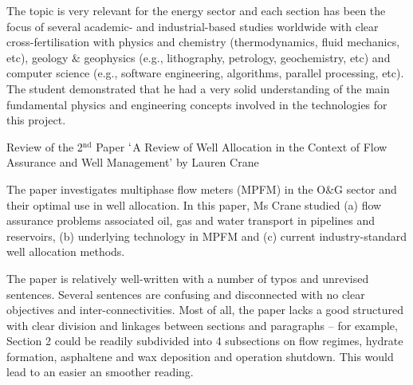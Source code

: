\documentclass[14pt,twoside]{report}
\begin{document}
The topic is very relevant for the energy sector and each section has been the focus of several academic- and industrial-based studies worldwide with clear cross-fertilisation with physics and chemistry (thermodynamics, fluid mechanics, etc), geology $\&$ geophysics (e.g., lithography, petrology, geochemistry, etc) and computer science (e.g., software engineering, algorithms, parallel processing, etc).  The student demonstrated that he had a very solid understanding of the main fundamental physics and engineering concepts involved in the technologies for this project.

\clearpage



\bigskip

\begin{center}
  {\Large Review of the 2$^{\text{nd}}$ Paper $\lq$A Review of Well Allocation in the Context of Flow Assurance and Well Management' by Lauren Crane}
\end{center}

The paper investigates multiphase flow meters (MPFM) in the O$\&$G sector and their optimal use in well allocation. In this paper, Ms Crane studied (a) flow assurance problems associated  oil, gas and water transport in pipelines and reservoirs, (b) underlying technology in MPFM and (c) current industry-standard well allocation methods.

The paper is relatively well-written with a number of typos and unrevised sentences. Several sentences are confusing and disconnected with no clear objectives and inter-connectivities. Most of all, the paper lacks a good structured with clear division and linkages between sections and paragraphs -- for example, Section 2 could be readily subdivided into 4 subsections on flow regimes, hydrate formation, asphaltene and wax deposition and operation shutdown. This would lead to an easier an smoother reading. 
\end{document}

